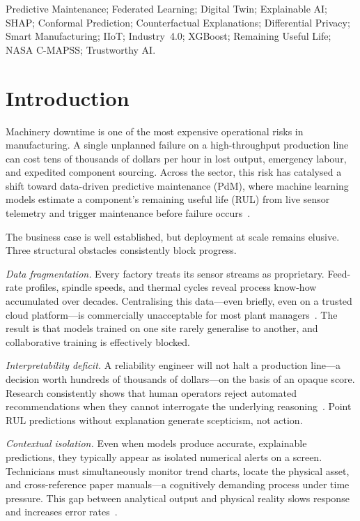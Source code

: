 \documentclass[10pt, journal, letterpaper]{IEEEtran}
\begin{document}
\begin{IEEEkeywords}
Predictive Maintenance; Federated Learning; Digital Twin; Explainable AI;
SHAP; Conformal Prediction; Counterfactual Explanations; Differential Privacy;
Smart Manufacturing; IIoT; Industry~4.0; XGBoost; Remaining Useful Life;
NASA C-MAPSS; Trustworthy AI.
\end{IEEEkeywords}

\section{Introduction}
\label{sec:intro}

Machinery downtime is one of the most expensive operational risks in
manufacturing. A single unplanned failure on a high-throughput production line
can cost tens of thousands of dollars per hour in lost output, emergency labour,
and expedited component sourcing. Across the sector, this risk has catalysed
a shift toward data-driven predictive maintenance (PdM), where machine learning
models estimate a component's remaining useful life (RUL) from live sensor
telemetry and trigger maintenance before failure occurs~\cite{jardine2006,pan2025}.

The business case is well established, but deployment at scale remains elusive.
Three structural obstacles consistently block progress.

\textit{Data fragmentation.} Every factory treats its sensor streams as
proprietary. Feed-rate profiles, spindle speeds, and thermal cycles reveal
process know-how accumulated over decades. Centralising this data—even briefly,
even on a trusted cloud platform—is commercially unacceptable for most plant
managers~\cite{kairouz2021,yang2019fl}. The result is that models trained on
one site rarely generalise to another, and collaborative training is effectively
blocked.

\textit{Interpretability deficit.} A reliability engineer will not halt a
production line—a decision worth hundreds of thousands of dollars—on the basis
of an opaque score. Research consistently shows that human operators reject
automated recommendations when they cannot interrogate the underlying
reasoning~\cite{dosivelez2017,arrieta2020}. Point RUL predictions without
explanation generate scepticism, not action.

\textit{Contextual isolation.} Even when models produce accurate, explainable
predictions, they typically appear as isolated numerical alerts on a
screen. Technicians must simultaneously monitor trend charts, locate the
physical asset, and cross-reference paper manuals—a cognitively demanding
process under time pressure. This gap between analytical output and
physical reality slows response and increases error rates~\cite{vandinter2022}.
\end{document}
